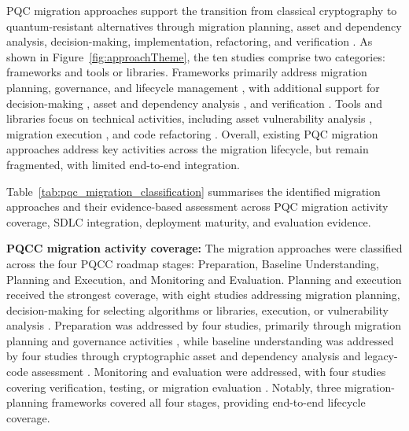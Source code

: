 \documentclass[letterpaper,twocolumn,10pt]{article}
\begin{document}
PQC migration approaches support the transition from classical cryptography to quantum-resistant alternatives through migration planning, asset and dependency analysis, decision-making, implementation, refactoring, and verification \cite{naether_migrating_2024, migration_Comparison}. As shown in Figure~\ref{fig:approachTheme}, the ten studies comprise two categories: frameworks and tools or libraries. Frameworks primarily address migration planning, governance, and lifecycle management \cite{Ana_MigFrDepen, Ana_MigFrameOrg, Ana_PMMP, Ana_FinanceMig}, with additional support for decision-making \cite{Ana_decisionAlgo}, asset and dependency analysis \cite{Ana_MigFrDepen}, and verification \cite{Ana_e27020212}. Tools and libraries focus on technical activities, including asset vulnerability analysis \cite{Ana_rattanavipanon_toolchain_2025}, migration execution \cite{Ana_android_Migr}, and code refactoring \cite{Ana_ccPASTpqc, Ana_legacyToQuantumConvert}. Overall, existing PQC migration approaches address key activities across the migration lifecycle, but remain fragmented, with limited end-to-end integration.

Table~\ref{tab:pqc_migration_classification} summarises the identified migration approaches and their evidence-based assessment across PQC migration activity coverage, SDLC integration, deployment maturity, and evaluation evidence.

\textbf{PQCC migration activity coverage:} The migration approaches were classified across the four PQCC roadmap stages: Preparation, Baseline Understanding, Planning and Execution, and Monitoring and Evaluation. Planning and execution received the strongest coverage, with eight studies addressing migration planning, decision-making for selecting algorithms or libraries, execution, or vulnerability analysis \cite{Ana_MigFrDepen, Ana_MigFrameOrg, Ana_FinanceMig, Ana_decisionAlgo, Ana_rattanavipanon_toolchain_2025, Ana_android_Migr, Ana_ccPASTpqc, Ana_legacyToQuantumConvert}. 
Preparation was addressed by four studies, primarily through migration planning and governance activities \cite{Ana_MigFrDepen, Ana_MigFrameOrg, Ana_PMMP, Ana_FinanceMig}, while baseline understanding was addressed by four studies through cryptographic asset and dependency analysis and legacy-code assessment \cite{Ana_MigFrDepen, Ana_MigFrameOrg, Ana_FinanceMig, Ana_legacyToQuantumConvert}. Monitoring and evaluation were addressed, with four studies covering verification, testing, or migration evaluation \cite{Ana_MigFrDepen, Ana_MigFrameOrg, Ana_FinanceMig, Ana_e27020212}. Notably, three migration-planning frameworks \cite{Ana_MigFrDepen, Ana_MigFrameOrg, Ana_FinanceMig} covered all four stages, providing end-to-end lifecycle coverage.
\end{document}
